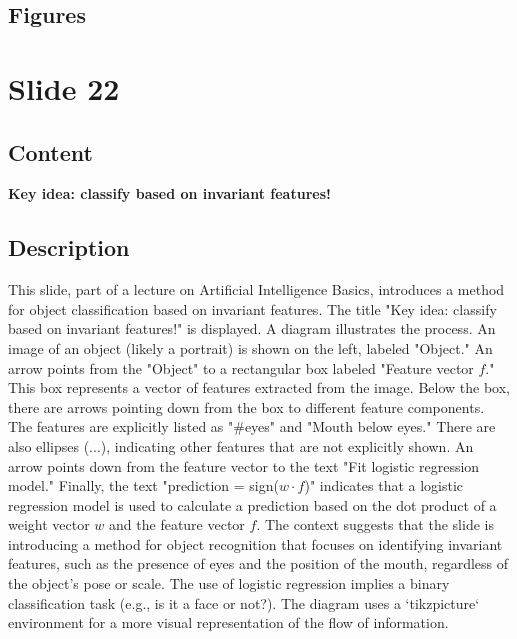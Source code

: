 \documentclass{article}%
\begin{document}
\subsection{Figures}%
\begin{figure}[H]%
\centering%
\end{figure}

%
\newpage%
\section{Slide 22}%
\label{sec:Slide22}%
\subsection{Content}%

\textbf{Key idea: classify based on invariant features!}

%
\subsection{Description}%
This slide, part of a lecture on Artificial Intelligence Basics, introduces a method for object classification based on invariant features.  The title "Key idea: classify based on invariant features!" is displayed.  A diagram illustrates the process.  An image of an object (likely a portrait) is shown on the left, labeled "Object."  An arrow points from the "Object" to a rectangular box labeled "Feature vector $f$."  This box represents a vector of features extracted from the image.  Below the box, there are arrows pointing down from the box to different feature components.  The features are explicitly listed as "#eyes" and "Mouth below eyes."  There are also ellipses (...), indicating other features that are not explicitly shown.  An arrow points down from the feature vector to the text "Fit logistic regression model."  Finally, the text "prediction = sign($w \cdot f$)" indicates that a logistic regression model is used to calculate a prediction based on the dot product of a weight vector $w$ and the feature vector $f$.  The context suggests that the slide is introducing a method for object recognition that focuses on identifying invariant features, such as the presence of eyes and the position of the mouth, regardless of the object's pose or scale.  The use of logistic regression implies a binary classification task (e.g., is it a face or not?). The diagram uses a `tikzpicture` environment for a more visual representation of the flow of information.%
\end{document}
